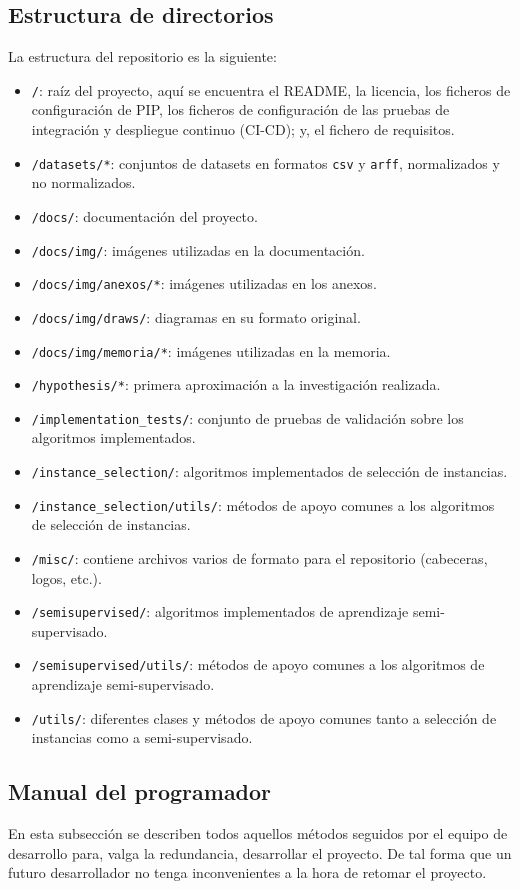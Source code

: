 \subsection{Estructura de directorios}
La estructura del repositorio es la siguiente:
\begin{itemize}
\tightlist
\item \texttt{/}: raíz del proyecto, aquí se encuentra el README, la licencia, los ficheros de configuración de PIP, los ficheros de configuración de las pruebas de integración y despliegue continuo (CI-CD); y, el fichero de requisitos.
\item \texttt{/datasets/*}: conjuntos de datasets en formatos \texttt{csv} y \texttt{arff}, normalizados y no normalizados.
\item \texttt{/docs/}: documentación del proyecto.
\item \texttt{/docs/img/}: imágenes utilizadas en la documentación.
\item \texttt{/docs/img/anexos/*}: imágenes utilizadas en los anexos.
\item \texttt{/docs/img/draws/}: diagramas en su formato original.
\item \texttt{/docs/img/memoria/*}: imágenes utilizadas en la memoria.
\item \texttt{/hypothesis/*}: primera aproximación a la investigación realizada.
\item \texttt{/implementation\_tests/}: conjunto de pruebas de validación sobre los algoritmos implementados.
\item \texttt{/instance\_selection/}: algoritmos implementados de selección de instancias.
\item \texttt{/instance\_selection/utils/}: métodos de apoyo comunes a los algoritmos de selección de instancias.
\item \texttt{/misc/}: contiene archivos varios de formato para el repositorio (cabeceras, logos, etc.).
\item \texttt{/semisupervised/}: algoritmos implementados de aprendizaje semi-supervisado.
\item \texttt{/semisupervised/utils/}: métodos de apoyo comunes a los algoritmos de aprendizaje semi-supervisado.
\item \texttt{/utils/}: diferentes clases y métodos de apoyo comunes tanto a selección de instancias como a semi-supervisado.
\end{itemize}

\subsection{Manual del programador}
En esta subsección se describen todos aquellos métodos seguidos por el equipo de desarrollo para, valga la redundancia, desarrollar el proyecto. De tal forma que un futuro desarrollador no tenga inconvenientes a la hora de retomar el proyecto.


